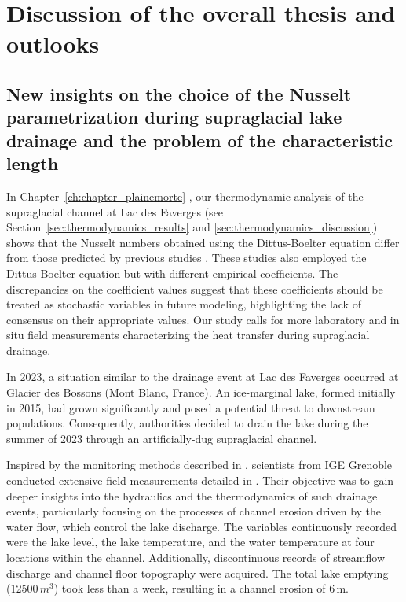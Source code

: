 \chapter{Discussion of the overall thesis and outlooks}
\label{ch:discussion}

\section{New insights on the choice of the Nusselt parametrization during supraglacial lake drainage and the problem of the characteristic length}

In Chapter~\ref{ch:chapter_plainemorte} \citep[published as][]{Ogier&al2021}, our thermodynamic analysis of the supraglacial channel at Lac des Faverges (see Section~\ref{sec:thermodynamics_results} and \ref{sec:thermodynamics_discussion}) shows that the Nusselt numbers obtained using the Dittus-Boelter equation differ from those predicted by previous studies \citep{Lunardini&al1986, Clarke2003, Vincent&al2010}. These studies also employed the Dittus-Boelter equation but with different empirical coefficients. The discrepancies on the coefficient values suggest that these coefficients should be treated as stochastic variables in future modeling, highlighting the lack of consensus on their appropriate values. Our study calls for more laboratory and in situ field measurements characterizing the heat transfer during supraglacial drainage.

In 2023, a situation similar to the drainage event at Lac des Faverges occurred at Glacier des Bossons (Mont Blanc, France). An ice-marginal lake, formed initially in 2015, had grown significantly and posed a potential threat to downstream populations. Consequently, authorities decided to drain the lake during the summer of 2023 through an artificially-dug supraglacial channel. 

Inspired by the monitoring methods described in \cite{Ogier&al2021}, scientists from IGE Grenoble conducted extensive field measurements detailed in \cite{Gagliardini&al2024}. Their objective was to gain deeper insights into the hydraulics and the thermodynamics of such drainage events, particularly focusing on the processes of channel erosion driven by the water flow, which control the lake discharge. The variables continuously recorded were the lake level, the lake temperature, and the water temperature at four locations within the channel. Additionally, discontinuous records of streamflow discharge and channel floor topography were acquired. The total lake emptying (12500\,$m^3$) took less than a week, resulting in a channel erosion of 6\,m.

